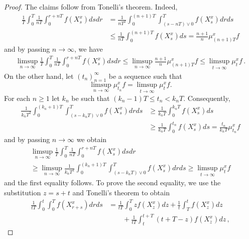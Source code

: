 \documentclass[final]{amsart}
\numberwithin{thm}{section}
\numberwithin{equation}{section}
\begin{document}
\begin{proof}
    The claims follow from Tonelli's theorem. Indeed,
    \begin{align*}
        \frac{1}{T}\int_0^T \frac{1}{nT} \int_0^{r + nT} f(X_s^x)dsdr &= \frac{1}{nT^2} \int_0^{(n+1)T} \int_{(s-nT)\vee 0}^Tf(X_s^x)dr ds \\
        &\leq \frac{1}{nT} \int_0^{(n+1)T}f(X_s^x)ds = \frac{n+1}{n} \mu_{(n+1)T}^xf 
    \end{align*}
and by passing $n \to \infty$, we have 
    \begin{align*}
  \limsup_{n \to \infty} \frac{1}{T}\int_0^T \frac{1}{nT} \int_0^{r + nT} f(X_s^x)dsdr 
        \leq 
        \limsup_{n \to \infty} \frac{n+1}{n} \mu_{(n+1)T}^xf 
        \leq \limsup_{t \to \infty} \mu_{t}^xf \,.
    \end{align*}
On the other hand, let $(t_n)_{n = 1}^\infty$ be a sequence such that 
$$
\limsup_{n \to \infty} \mu_{t_n}^xf = \limsup_{t \to \infty}  \mu_{t}^xf .
$$ 
For each $n \geq 1$ let $k_n$ be such that 
$(k_n -1)T \leq t_n < k_n T$. 
Consequently, 
    \begin{align*}
        \frac{1}{k_n T^2} \int_0^{(k_n+1)T} \int_{(s-k_nT)\vee 0}^Tf(X_s^x)dr ds 
        &\geq \frac{1}{k_nT} \int_0^{k_nT}f(X_s^x)ds \\
        &\geq \frac{1}{k_nT} \int_0^{t_n}f(X_s^x)ds  
        =  \frac{t_n}{k_nT} \mu_{t_n}^xf
    \end{align*}
    and by passing $n \to \infty$ we obtain
\begin{multline*}
  \limsup_{n \to \infty} \frac{1}{T}\int_0^T \frac{1}{nT} \int_0^{r + nT} f(X_s^x)dsdr \\
  \geq 
 \limsup_{n \to \infty}  \frac{1}{k_n T^2} \int_0^{(k_n+1)T} \int_{(s-k_nT)\vee 0}^Tf(X_s^x)dr ds 
        \geq 
         \limsup_{t \to \infty} \mu_{t}^xf 
\end{multline*}
and the first equality follows. To prove the second equality, we 
use the substitution $z = s+t$ and Tonelli's theorem to obtain
\begin{align*}
\frac{1}{tT}
\int_0^t\int_0^T f(X_{r+s}^x)drds &= \frac{1}{tT} \int_0^T zf(X_z^x)dz + \frac{1}{t}\int_T^t f(X_z^x)dz
\\ &\qquad + \frac{1}{tT} \int_t^{t + T} (t+T-z)f(X_z^x)dz \,,
\end{align*}



\end{proof}
\end{document}
